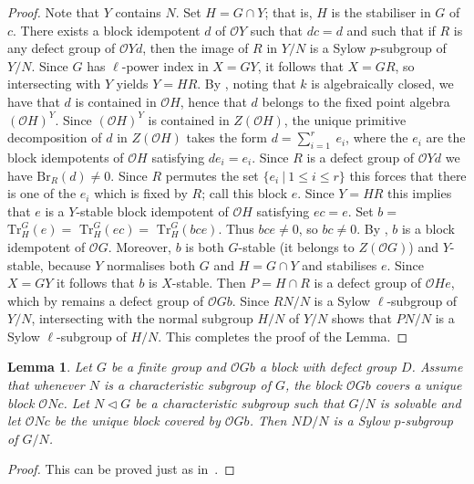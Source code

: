 \documentclass{amsart}
\theoremstyle{plain}\newtheorem{Theorem}{Theorem}[section]
\theoremstyle{plain}\newtheorem{Conjecture}[Theorem]{Conjecture}
\theoremstyle{plain}\newtheorem{Corollary}[Theorem]{Corollary}
\theoremstyle{plain}\newtheorem{Lemma}[Theorem]{Lemma}
\theoremstyle{plain}\newtheorem{Proposition}[Theorem]{Proposition}
\theoremstyle{definition}\newtheorem{Definition}[Theorem]{Definition}
\theoremstyle{definition}\newtheorem{Example}[Theorem]{Example}
\theoremstyle{definition}\newtheorem{Examples}[Theorem]{Examples}
\theoremstyle{definition}\newtheorem{Exercise}[Theorem]{Exercise}
\theoremstyle{definition}\newtheorem{Notation}[Theorem]{Notation}
\theoremstyle{definition}\newtheorem{Remark}[Theorem]{Remark}
\theoremstyle{definition}\newtheorem{Remarks}[Theorem]{Remarks}
\def\CO{{\mathcal{O}}}    \def\OPE{{\mathcal{O}(P\rtimes E)}}
\def\Br{\mathrm{Br}}                 \def\ten{\otimes}
\def\Tr{\mathrm{Tr}}             \def\tenOT{\otimes_{\mathcal{O}T}}
\numberwithin{equation}{section}
\begin{document}
\begin{proof}
Note that $Y$ contains $N$. Set $H=G\cap Y$; that is, $H$ is the stabiliser in $G$ of $c$.
There exists a block idempotent $d$ of $\CO Y$
such that $dc=d$ and such that if $R$ is any defect group of $\CO Yd$, then the
image of $R$ in $Y/N$ is a Sylow $p$-subgroup of $Y/N$. Since $G$ has $\ell$-power
index in $X=GY$, it follows that $X=GR$, so intersecting with $Y$ yields
$Y=HR$. By \cite[Thm.~6.5.4]{LiBookII}, noting that $k$ is algebraically closed, we have that $d$ is contained in $\CO H$,
hence that $d$ belongs to the fixed point algebra  $ (\CO H)^Y$. 
Since $(\CO H)^Y$ is contained in $Z(\CO H)$, the
unique primitive decomposition of $d$ in $Z(\CO H)$ takes the form
$d=\sum_{i=1}^r\ e_i$, where the $e_i$ are the block
idempotents of $\CO H$ satisfying $de_i=e_i$. Since $R$ is a defect group of $\CO Yd$ 
we have $\Br_R(d)\neq 0$. Since $R$ permutes the set $\{e_i\ | \ 1 \leq i\leq r\}$ this
forces that there is one of the $e_i$ which is fixed by $R$; call this block $e$.
Since $Y=HR$ this implies that
$e$ is a $Y$-stable block idempotent of $\CO H$ satisfying $ec=e$.
Set $b=$ $\Tr^G_H(e) =$ $\Tr^G_H(ec)=$ $\Tr^G_H(bce)$. 
Thus $bce\neq 0$, so $bc\neq 0$.
By \cite[Thm.~6.8.3, Lem.~6.8.4]{LiBookII}, $b$ is a block idempotent of $\CO G$.
Moreover, $b$ is both $G$-stable (it belongs to $Z(\CO G)$) and $Y$-stable, because
$Y$ normalises both $G$ and $H=G\cap Y$ and stabilises $e$. Since $X=GY$ it
follows that  $b$ is $X$-stable.
Then $P=H\cap R$ is a defect group of $\CO He$, which by
\cite[Thm.~6.8.3]{LiBookII} remains a defect group of $\CO Gb$. Since $RN/N$ is a 
Sylow $\ell$-subgroup of $Y/N$, intersecting with the normal subgroup $H/N$ of 
$Y/N$ shows that $PN/N$ is a Sylow $\ell$-subgroup of $H/N$. This completes the
proof of the Lemma.
\end{proof}



\begin{Lemma}
Let $G$ be a finite group and  $\CO G b$ a block  with defect group $D$. Assume that whenever $N$ is a characteristic subgroup of $G$, the block $\CO G b$ covers a unique block $\CO N c$. Let $N \lhd G$  be a characteristic subgroup such that $G/N$ is solvable and let $\CO N c$ be the unique block covered by $\CO Gb$. Then $ND/N$ is a Sylow $p$-subgroup of $G/N$.
\end{Lemma}
\begin{proof}
  This can be proved just   as  in~\cite[Lem.~2.4]{ar19}.
\end{proof}
\end{document}
